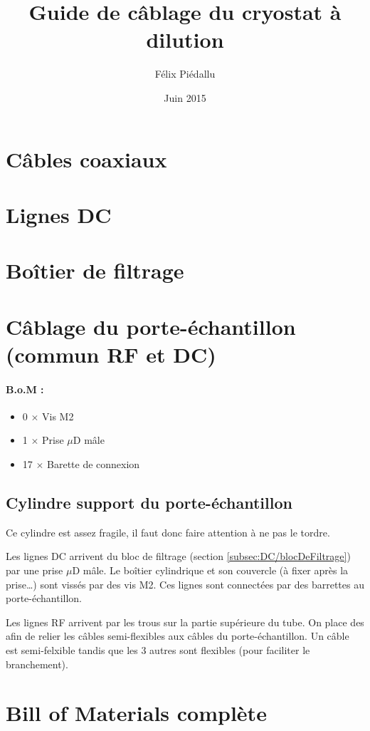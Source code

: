\documentclass[a4paper,11pt]{article}
\title{Guide de câblage du cryostat à dilution}
\author{Félix Piédallu}
\date{Juin 2015}
\newcommand{\fois}{$\times$ }
\newcommand{\uD}{$\mu$D }
\newenvironment{BOM}
  {%
    \paragraph{B.o.M : } \begin{itemize}%
  }{%
    \end{itemize}\medskip%
  }
\begin{document}
\maketitle
\tableofcontents


\section{Câbles coaxiaux}


\newpage
\section{Lignes DC}


\section{Boîtier de filtrage}



\section{Câblage du porte-échantillon (commun RF et DC)}
\begin{BOM}
    \item 0 \fois Vis M2
    \item 1 \fois Prise \uD mâle
    \item 17 \fois Barette de connexion
\end{BOM}
\subsection{Cylindre support du porte-échantillon}
Ce cylindre est assez fragile, il faut donc faire attention à ne pas le tordre.\medskip

Les lignes DC arrivent du bloc de filtrage (section \ref{subsec:DC/blocDeFiltrage}) par une prise \uD mâle. Le boîtier cylindrique et son couvercle (à fixer après la prise…) sont vissés par des vis M2. Ces lignes sont connectées par des barrettes au porte-échantillon.\medskip

Les lignes RF arrivent par les trous sur la partie supérieure du tube. On place des 
afin de relier les câbles semi-flexibles aux câbles du porte-échantillon. Un câble est semi-felxible tandis que les 3 autres sont flexibles (pour faciliter le branchement).

\section{Bill of Materials complète}
\end{document}
